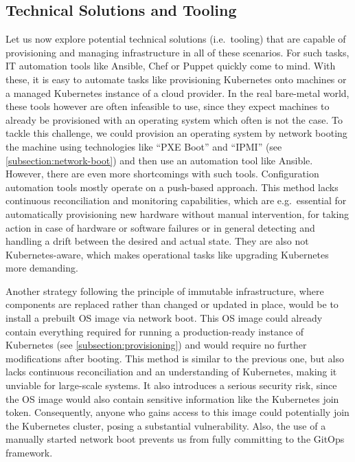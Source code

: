     \subsection{Technical Solutions and Tooling}
    
    Let us now explore potential technical solutions (i.e.\ tooling) that are capable of provisioning and managing infrastructure in all of these scenarios. For such tasks, IT automation tools like Ansible, Chef or Puppet quickly come to mind. With these, it is easy to automate tasks like provisioning Kubernetes onto machines or a managed Kubernetes instance of a cloud provider. In the real bare-metal world, these tools however are often infeasible to use, since they expect machines to already be provisioned with an operating system which often is not the case. To tackle this challenge, we could provision an operating system by network booting the machine using technologies like ``PXE Boot'' and ``IPMI'' (see \autoref{subsection:network-boot}) and then use an automation tool like Ansible. However, there are even more shortcomings with such tools. Configuration automation tools mostly operate on a push-based approach. This method lacks continuous reconciliation and monitoring capabilities, which are e.g.\ essential for automatically provisioning new hardware without manual intervention, for taking action in case of hardware or software failures or in general detecting and handling a drift between the desired and actual state. They are also not Kubernetes-aware, which makes operational tasks like upgrading Kubernetes more demanding.

    Another strategy following the principle of immutable infrastructure, where components are replaced rather than changed or updated in place, would be to install a prebuilt OS image via network boot. This OS image could already contain everything required for running a production-ready instance of Kubernetes (see \autoref{subsection:provisioning}) and would require no further modifications after booting. This method is similar to the previous one, but also lacks continuous reconciliation and an understanding of Kubernetes, making it unviable for large-scale systems. It also introduces a serious security risk, since the OS image would also contain sensitive information like the Kubernetes join token. Consequently, anyone who gains access to this image could potentially join the Kubernetes cluster, posing a substantial vulnerability. Also, the use of a manually started network boot prevents us from fully committing to the GitOps framework.

